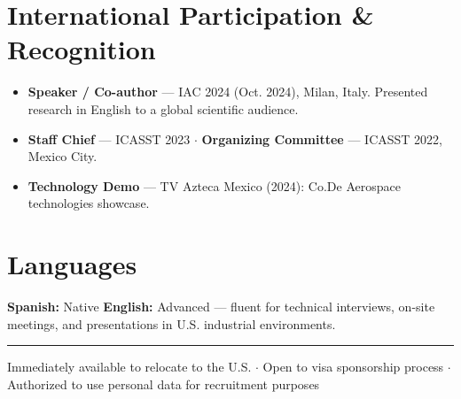\documentclass[10pt, letterpaper]{article}
\begin{document}
\section{International Participation \& Recognition}

{\small\color{gristexto}
\begin{itemize}
  \item \textbf{Speaker / Co-author} --- IAC 2024 (Oct. 2024), Milan, Italy. Presented research in English to a global scientific audience.
  \item \textbf{Staff Chief} --- ICASST 2023 $\cdot$ \textbf{Organizing Committee} --- ICASST 2022, Mexico City.
  \item \textbf{Technology Demo} --- TV Azteca Mexico (2024): Co.De Aerospace technologies showcase.
\end{itemize}
}

\section{Languages}

{\small\color{gristexto}
\textbf{Spanish:} Native \quad \textbf{English:} Advanced --- fluent for technical interviews, on-site meetings, and presentations in U.S. industrial environments.
}

\vspace{3pt}
{\color{lineagris}\rule{\linewidth}{0.3pt}}
{\footnotesize\centering\color{gristexto}
Immediately available to relocate to the U.S. \textbf{$\cdot$} Open to visa sponsorship process \textbf{$\cdot$} Authorized to use personal data for recruitment purposes
}
\end{document}
